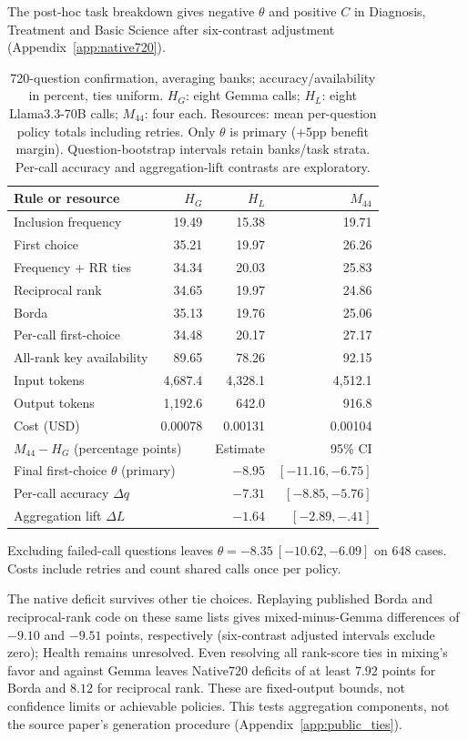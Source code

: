 \documentclass{article}
\begin{document}
The post-hoc task breakdown gives negative $\theta$ and positive $C$ in Diagnosis, Treatment and Basic Science after six-contrast adjustment (Appendix~\ref{app:native720}).

\begin{table}[t]
\centering\small
\caption{720-question confirmation, averaging banks; accuracy/availability in percent, ties uniform. $H_G$: eight Gemma calls; $H_L$: eight Llama3.3-70B calls; $M_{44}$: four each. Resources: mean per-question policy totals including retries. Only $\theta$ is primary ($+5$pp benefit margin). Question-bootstrap intervals retain banks/task strata. Per-call accuracy and aggregation-lift contrasts are exploratory.}
\label{tab:competent}
\begin{tabular}{lrrr}
\toprule
Rule or resource & $H_G$ & $H_L$ & $M_{44}$\\
\midrule
Inclusion frequency & 19.49 & 15.38 & 19.71\\
First choice & 35.21 & 19.97 & 26.26\\
Frequency + RR ties & 34.34 & 20.03 & 25.83\\
Reciprocal rank & 34.65 & 19.97 & 24.86\\
Borda & 35.13 & 19.76 & 25.06\\
Per-call first-choice & 34.48 & 20.17 & 27.17\\
All-rank key availability & 89.65 & 78.26 & 92.15\\
Input tokens & 4,687.4 & 4,328.1 & 4,512.1\\
Output tokens & 1,192.6 & 642.0 & 916.8\\
Cost (USD) & 0.00078 & 0.00131 & 0.00104\\
\midrule
\multicolumn{2}{l}{$M_{44}-H_G$ (percentage points)} & Estimate & 95\% CI\\
\multicolumn{2}{l}{Final first-choice $\theta$ (primary)} & $-8.95$ & $[-11.16,-6.75]$\\
\multicolumn{2}{l}{Per-call accuracy $\Delta q$} & $-7.31$ & $[-8.85,-5.76]$\\
\multicolumn{2}{l}{Aggregation lift $\Delta L$} & $-1.64$ & $[-2.89,-.41]$\\
\bottomrule
\end{tabular}
\end{table}

Excluding failed-call questions leaves $\theta=-8.35\ [-10.62,-6.09]$ on 648 cases. Costs include retries and count shared calls once per policy.

The native deficit survives other tie choices. Replaying published Borda and reciprocal-rank code on these same lists gives mixed-minus-Gemma differences of $-9.10$ and $-9.51$ points, respectively (six-contrast adjusted intervals exclude zero); Health remains unresolved. Even resolving all rank-score ties in mixing's favor and against Gemma leaves Native720 deficits of at least $7.92$ points for Borda and $8.12$ for reciprocal rank. These are fixed-output bounds, not confidence limits or achievable policies. This tests aggregation components, not the source paper's generation procedure (Appendix~\ref{app:public_ties}).
\end{document}
